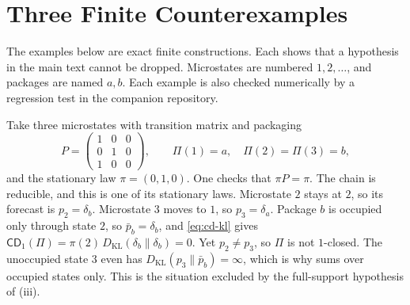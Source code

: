 \section{Three Finite Counterexamples}\label{app:counterexamples}

The examples below are exact finite constructions. Each shows that a hypothesis in the main text cannot be dropped. Microstates are numbered $1,2,\dots$, and packages are named $a,b$. Each example is also checked numerically by a regression test in the companion repository.

\begin{example}\label{ex:null-state}
Take three microstates with transition matrix and packaging
\[
P=\begin{pmatrix}1&0&0\\0&1&0\\1&0&0\end{pmatrix},
\qquad
\Pi(1)=a,\quad \Pi(2)=\Pi(3)=b,
\]
and the stationary law $\pi=(0,1,0)$. One checks that $\pi P=\pi$. The chain is reducible, and this is one of its stationary laws. Microstate $2$ stays at $2$, so its forecast is $p_2=\delta_b$. Microstate $3$ moves to $1$, so $p_3=\delta_a$. Package $b$ is occupied only through state $2$, so $\bar p_b=\delta_b$, and \eqref{eq:cd-kl} gives $\mathsf{CD}_1(\Pi)=\pi(2)\,D_{\mathrm{KL}}(\delta_b\|\delta_b)=0$. Yet $p_2\ne p_3$, so $\Pi$ is not $1$-closed. The unoccupied state $3$ even has $D_{\mathrm{KL}}(p_3\|\bar p_b)=\infty$, which is why  sums over occupied states only. This is the situation excluded by the full-support hypothesis of (iii).
\end{example}

